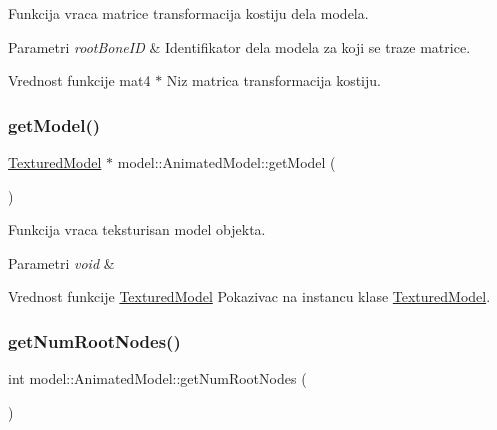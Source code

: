 Funkcija vraca matrice transformacija kostiju dela modela. 


\begin{DoxyParams}{Parametri}
{\em root\+Bone\+ID} & Identifikator dela modela za koji se traze matrice. \\
\hline
\end{DoxyParams}
\begin{DoxyReturn}{Vrednost funkcije}
mat4 $\ast$ Niz matrica transformacija kostiju. 
\end{DoxyReturn}
\mbox{\label{classmodel_1_1AnimatedModel_aad16bb9c53cb3b9bacb39e50c5ecee33}} 
\subsubsection{\texorpdfstring{get\+Model()}{getModel()}}
{\footnotesize\ttfamily \hyperlink{classmodel_1_1TexturedModel}{Textured\+Model} $\ast$ model\+::\+Animated\+Model\+::get\+Model (\begin{DoxyParamCaption}{ }\end{DoxyParamCaption})}



Funkcija vraca teksturisan model objekta. 


\begin{DoxyParams}{Parametri}
{\em void} & \\
\hline
\end{DoxyParams}
\begin{DoxyReturn}{Vrednost funkcije}
\hyperlink{classmodel_1_1TexturedModel}{Textured\+Model} Pokazivac na instancu klase \hyperlink{classmodel_1_1TexturedModel}{Textured\+Model}. 
\end{DoxyReturn}
\mbox{\label{classmodel_1_1AnimatedModel_ae26d43c3b5b3a3f623418666f787565f}} 
\subsubsection{\texorpdfstring{get\+Num\+Root\+Nodes()}{getNumRootNodes()}}
{\footnotesize\ttfamily int model\+::\+Animated\+Model\+::get\+Num\+Root\+Nodes (\begin{DoxyParamCaption}{ }\end{DoxyParamCaption})}



